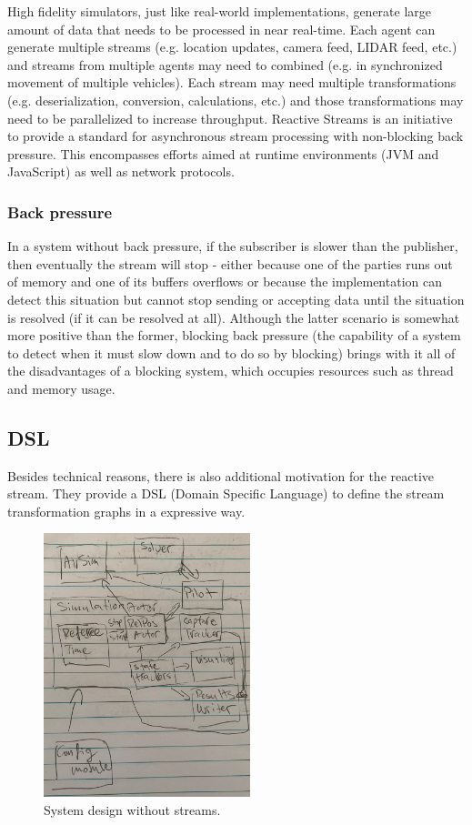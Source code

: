 \documentclass{article}
\begin{document}
High fidelity simulators, just like real-world implementations, generate large amount of data that needs to be processed in near real-time. Each agent can generate multiple streams (e.g. location updates, camera feed, LIDAR feed, etc.) and streams from multiple agents may need to combined (e.g. in synchronized movement of multiple vehicles). Each stream may need multiple transformations (e.g. deserialization, conversion, calculations, etc.) and those transformations may need to be parallelized to increase throughput.
Reactive Streams is an initiative to provide a standard for asynchronous stream processing with non-blocking back pressure. This encompasses efforts aimed at runtime environments (JVM and JavaScript) as well as network protocols. \cite{reactive-manifesto} 

\subsubsection{Back pressure}
In a system without back pressure, if the subscriber is slower than the publisher, then eventually the stream will stop - either because one of the parties runs out of memory and one of its buffers overflows or because the implementation can detect this situation but cannot  stop sending or accepting data until the situation is resolved (if it can be resolved at all). Although the latter scenario is somewhat more positive than the former, blocking back pressure (the capability of a system to detect when it must slow down and to do so by blocking) brings with it all of the disadvantages of a blocking system, which occupies resources such as thread and memory usage. \cite{reactive-web-apps}

\subsection{DSL}
Besides technical reasons, there is also additional motivation for the reactive stream. They provide a DSL (Domain Specific Language) \cite{dsl-book} to define the stream transformation graphs in a expressive way. 

\begin{figure}
	\centering
	\includegraphics[width=6.0cm]{before-flow}
	\caption{System design without streams.}\label{fig:before-stream}
\end{figure}
\end{document}
